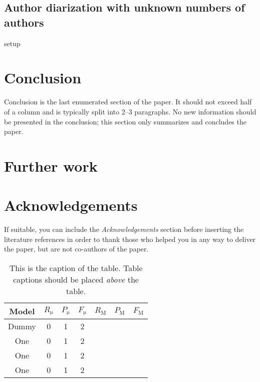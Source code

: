 \documentclass[10pt, a4paper]{article}
\begin{document}
\subsection{Author diarization with unknown numbers of authors}

setup

\section{Conclusion}

Conclusion is the last enumerated section of the paper. It should not exceed half of a column and is typically split into 2--3 paragraphs. No new information should be presented in the conclusion; this section only summarizes and concludes the paper.

\section{Further work}

\section*{Acknowledgements}



If suitable, you can include the \textit{Acknowledgements} section before inserting the literature references  in order to thank those who helped you in any way to deliver the paper, but are not co-authors of the paper.

\begin{table}
	\caption{This is the caption of the table. Table captions should be placed \textit{above} the table.}
	\label{tab:narrow-table}
	\begin{center}
		\begin{tabular}{c|ccc|ccc}
			\toprule
			Model & $R_\mathrm{\mu}$ & $P_\mathrm{\mu}$ & $F_\mathrm{\mu}$ & $R_\mathrm{M}$ & $P_\mathrm{M}$ & $F_\mathrm{M}$\\
			\midrule
			Dummy & 0 & 1 & 2 \\
			One & 0 & 1 & 2 \\
			One & 0 & 1 & 2 \\
			\midrule
			One & 0 & 1 & 2 \\
			\bottomrule
		\end{tabular}
	\end{center}
\end{table}



\end{document}
